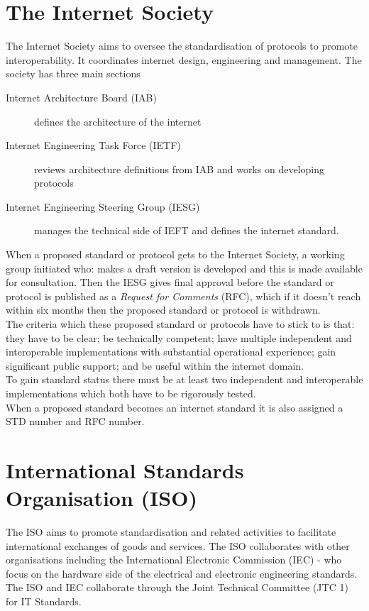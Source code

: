 
\section{The Internet Society}
The Internet Society aims to oversee the standardisation of protocols to promote interoperability. It coordinates internet design, engineering and management. The society has three main sections
\begin{description}
    \item[Internet Architecture Board (IAB)] defines the architecture of the internet
    \item[Internet Engineering Task Force (IETF)] reviews architecture definitions from IAB and works on developing protocols
    \item[Internet Engineering Steering Group (IESG)] manages the technical side of IEFT and defines the internet standard. 
\end{description}

When a proposed standard or protocol gets to the Internet Society, a working group initiated who: makes a draft version is developed and this is made available for consultation. Then the IESG gives final approval before the standard or protocol is published as a \textit{Request for Comments} (RFC), which if it doesn't reach within six months then the proposed standard or protocol is withdrawn.\\ The criteria which these proposed standard or protocols have to stick to is that: they have to be clear; be technically competent; have multiple independent and interoperable implementations with substantial operational experience; gain significant public support; and be useful within the internet domain. \\
To gain standard status there must be at least two independent and interoperable implementations which both have to be rigorously tested.\\
When a proposed standard becomes an internet standard it is also assigned a STD number and RFC number. 

\section{International Standards Organisation (ISO)}
The ISO aims to promote standardisation and related activities to facilitate international exchanges of goods and services. The ISO collaborates with other organisations including the International Electronic Commission (IEC) - who focus on the hardware side of the electrical and electronic engineering standards. The ISO and IEC collaborate through the Joint Technical Committee (JTC 1) for IT Standards.
